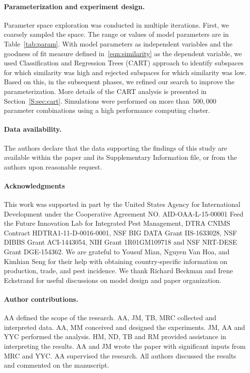 \documentclass[11pt]{article}
\theoremstyle{definition}
\begin{document}
\paragraph{Parameterization and experiment design.}
Parameter space exploration was conducted in multiple iterations.  First,
we coarsely sampled the space. The range or values of model parameters are
in Table~\ref{tab:param}. With model parameters as independent
variables and the goodness of fit measure defined in~\eqref{eqn:similarity}
as the dependent variable, we used Classification and Regression Trees
(CART) approach to identify subspaces for which similarity was high and
rejected subspaces for which similarity was low. Based on this, in the
subsequent phases, we refined our search to improve the parameterization.
More details of the CART analysis is presented in Section~\ref{S:sec:cart}.
Simulations were performed on more than~$500,000$ parameter combinations
using a high performance computing cluster. 


\paragraph{Data availability.} The authors declare that the data supporting the
findings of this study are available within the paper and its Supplementary
Information file, or from the authors upon reasonable request.

\paragraph{Acknowledgments}
This work was supported in part by the United States Agency for
International Development under the Cooperative Agreement NO.
AID-OAA-L-15-00001 Feed the Future Innovation Lab for Integrated Pest
Management, DTRA CNIMS Contract HDTRA1-11-D-0016-0001, NSF BIG DATA Grant
IIS-1633028, NSF DIBBS Grant ACI-1443054, NIH Grant 1R01GM109718 and NSF
NRT-DESE Grant DGE-154362.  We are grateful to Yousuf Mian, Nguyen Van Hoa,
and Kimhian Seng for their help with obtaining country-specific information
on production, trade, and pest incidence. We thank Richard Beckman and
Irene Eckstrand for useful discussions on model design and paper
organization.

\paragraph{Author contributions.}
AA defined the scope of the
research. AA, JM, TB, MRC collected and interpreted data.
AA, MM conceived and designed the
experiments. JM, AA and YYC performed the
analysis. HM, ND, TB and RM provided assistance in interpreting the
results. AA and JM wrote the paper with significant inputs from
MRC and YYC. AA supervised the research. All authors discussed the
results and commented on the manuscript.



\end{document}
